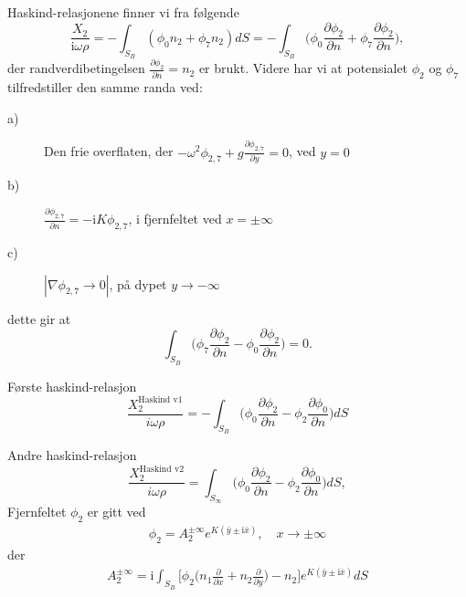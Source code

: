 Haskind-relasjonene finner vi fra følgende 
\begin{equation}
\frac{X_2}{\mathrm{i} \omega \rho}  =  - \int_{S_B}  ( \phi_0 n_2 + \phi_7 n_2) dS = - \int_{S_B}  \Big( \phi_0 \frac{\partial \phi_2}{\partial n} + \phi_7 \frac{\partial \phi_2}{\partial n} \Big),
\end{equation}
der randverdibetingelsen $\frac{\partial \phi_2}{\partial n} = n_2$ er brukt. Videre har vi at potensialet $\phi_2$ og $\phi_7$ tilfredstiller den samme randa ved: 
\begin{description}
\item[a)] Den frie overflaten, der $-\omega^2 \phi_{2,7} + g\frac{\partial \phi_{2,7}}{\partial y} = 0$, ved $y=0$ 
\item[b)] $\frac{\partial \phi_{2,7}}{\partial n} = -\mathrm{i} K \phi_{2,7}$, i fjernfeltet ved $x = \pm \infty$
\item[c)]  $|\nabla \phi_{2,7} \rightarrow 0 |$, på dypet $y  \rightarrow -\infty$
\end{description}

dette gir at 
\begin{equation}
\int_{S_B}  \big( \phi_7 \frac{\partial \phi_2}{\partial n} -\phi_0 \frac{\partial \phi_2}{\partial n}  \big) = 0. 
\end{equation}

%

Første haskind-relasjon
\begin{equation}
\frac{X_2^{\text{Haskind v1}}}{i \omega \rho} = -\int_{S_B}  \big( \phi_0 \frac{\partial \phi_2}{\partial n} -\phi_2 \frac{\partial \phi_0}{\partial n}  \big) dS 
\end{equation}

Andre haskind-relasjon
\begin{equation}
\frac{X_2^{\text{Haskind v2}}}{i \omega \rho} = \int_{S_\infty}  \big( \phi_0 \frac{\partial \phi_2}{\partial n} -\phi_2 \frac{\partial \phi_0}{\partial n}  \big) dS, 
\end{equation}
Fjernfeltet $\phi_2$ er gitt ved
\begin{align}
\phi_2 = A_2^{\pm \infty}e^{K (\bar{y} \pm \mathrm{i}  \bar{x}) },  \quad x \rightarrow\pm \infty
\end{align}
der
\begin{align}
A_2^{\pm \infty} =  \mathrm{i} \int_{S_B}   \bigg[ \phi_2  \Big(  n_1 \frac{\partial }{\partial x}  +  n_2\frac{\partial }{\partial y} \Big) - n_2 \bigg]  e^{K (\bar{y} \pm \mathrm{i}  \bar{x})} dS
\end{align}

